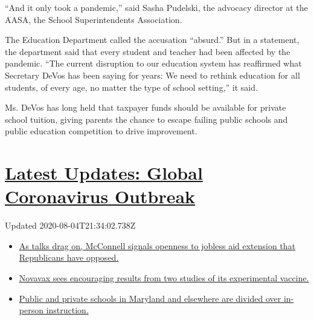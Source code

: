 ``And it only took a pandemic,'' said Sasha Pudelski, the advocacy
director at the AASA, the School Superintendents Association.

The Education Department called the accusation ``absurd.'' But in a
statement, the department said that every student and teacher had been
affected by the pandemic. ``The current disruption to our education
system has reaffirmed what Secretary DeVos has been saying for years: We
need to rethink education for all students, of every age, no matter the
type of school setting,'' it said.

Ms. DeVos has long held that taxpayer funds should be available for
private school tuition, giving parents the chance to escape failing
public schools and public education competition to drive improvement.

\hypertarget{latest-updates-global-coronavirus-outbreak}{%
\section{\texorpdfstring{\href{https://www.nytimes3xbfgragh.onion/2020/08/04/world/coronavirus-cases.html?action=click\&pgtype=Article\&state=default\&region=MAIN_CONTENT_1\&context=storylines_live_updates}{Latest
Updates: Global Coronavirus
Outbreak}}{Latest Updates: Global Coronavirus Outbreak}}\label{latest-updates-global-coronavirus-outbreak}}

Updated 2020-08-04T21:34:02.738Z

\begin{itemize}
\tightlist
\item
  \href{https://www.nytimes3xbfgragh.onion/2020/08/04/world/coronavirus-cases.html?action=click\&pgtype=Article\&state=default\&region=MAIN_CONTENT_1\&context=storylines_live_updates\#link-2daa96b5}{As
  talks drag on, McConnell signals openness to jobless aid extension
  that Republicans have opposed.}
\item
  \href{https://www.nytimes3xbfgragh.onion/2020/08/04/world/coronavirus-cases.html?action=click\&pgtype=Article\&state=default\&region=MAIN_CONTENT_1\&context=storylines_live_updates\#link-1228a480}{Novavax
  sees encouraging results from two studies of its experimental
  vaccine.}
\item
  \href{https://www.nytimes3xbfgragh.onion/2020/08/04/world/coronavirus-cases.html?action=click\&pgtype=Article\&state=default\&region=MAIN_CONTENT_1\&context=storylines_live_updates\#link-4825b93}{Public
  and private schools in Maryland and elsewhere are divided over
  in-person instruction.}
\end{itemize}

